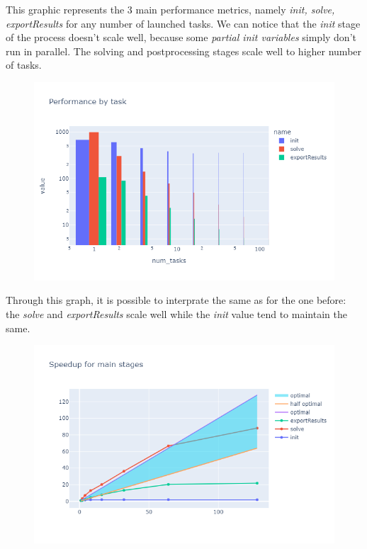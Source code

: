 \documentclass[12pt]{article}
\begin{document}
This graphic represents the 3 main performance metrics, namely \textit{init, solve, exportResults} for any number of launched tasks.
We can notice that the \textit{init} stage of the process doesn't scale well, because some \textit{partial init variables} simply don't run in  parallel.
The solving and postprocessing stages scale well to higher number of tasks.

\begin{figure}[H]
    \centering
    \includegraphics[width=\textwidth]{../illustrations/gayaByTask.png}
\end{figure}
Through this graph, it is possible to interprate the same as for the one before: \\
the \textit{solve} and \textit{exportResults} scale well while the \textit{init} value tend to maintain the same.

\begin{figure}[H]
    \centering
    \includegraphics[width=\textwidth]{../illustrations/gayaSpeedup.png}
\end{figure}
\end{document}
